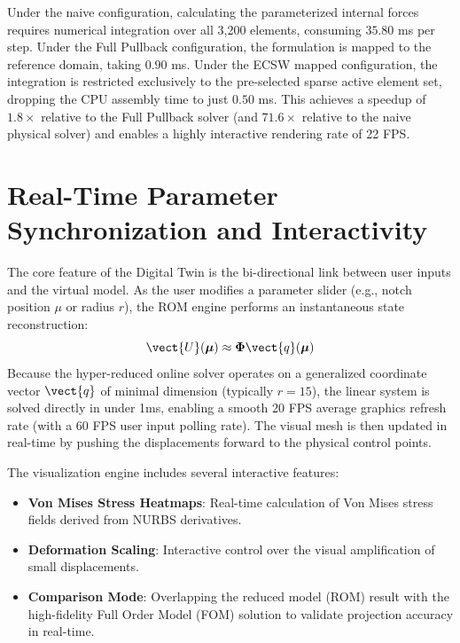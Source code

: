 Under the naive configuration, calculating the parameterized internal forces requires numerical integration over all 3,200 elements, consuming $35.80$ ms per step. Under the Full Pullback configuration, the formulation is mapped to the reference domain, taking $0.90$ ms. Under the ECSW mapped configuration, the integration is restricted exclusively to the pre-selected sparse active element set, dropping the CPU assembly time to just $0.50$ ms. This achieves a speedup of $1.8\times$ relative to the Full Pullback solver (and $71.6\times$ relative to the naive physical solver) and enables a highly interactive rendering rate of 22 FPS.







\section{Real-Time Parameter Synchronization and Interactivity}
The core feature of the Digital Twin is the bi-directional link between user inputs and the virtual model. As the user modifies a parameter slider (e.g., notch position $\mu$ or radius $r$), the ROM engine performs an instantaneous state reconstruction:
\begin{equation}
    \vect{U}(\boldsymbol{\mu}) \approx \boldsymbol{\Phi} \vect{q}(\boldsymbol{\mu})
\end{equation}
Because the hyper-reduced online solver operates on a generalized coordinate vector $\vect{q}$ of minimal dimension (typically $r = 15$), the linear system is solved directly in under 1ms, enabling a smooth 20 FPS average graphics refresh rate (with a 60 FPS user input polling rate). The visual mesh is then updated in real-time by pushing the displacements forward to the physical control points.

The visualization engine includes several interactive features:
\begin{itemize}
    \item \textbf{Von Mises Stress Heatmaps}: Real-time calculation of Von Mises stress fields derived from NURBS derivatives.
    \item \textbf{Deformation Scaling}: Interactive control over the visual amplification of small displacements.
    \item \textbf{Comparison Mode}: Overlapping the reduced model (ROM) result with the high-fidelity Full Order Model (FOM) solution to validate projection accuracy in real-time.
\end{itemize}

